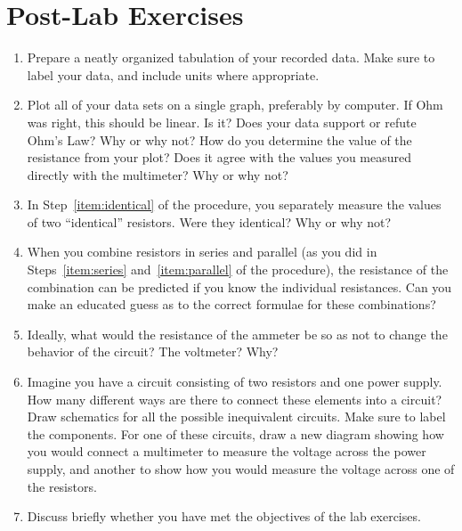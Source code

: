 \documentclass[12pt]{article}
\begin{document}
\newpage

\section*{Post-Lab Exercises}

\begin{enumerate}
\item Prepare a neatly organized tabulation of your recorded data.
  Make sure to label your data, and include units where appropriate.  
\item Plot all of your data sets on a single graph, preferably by
  computer.  If Ohm was right, this should be linear.  Is it?  Does
  your data support or refute Ohm's Law?  Why or why not?  How do you
  determine the value of the resistance from your plot?  Does it agree
  with the values you measured directly with the multimeter?  Why or
  why not?
\item In Step~\ref{item:identical} of the procedure, you separately
  measure the values of two ``identical'' resistors.  Were they
  identical?  Why or why not?
\item When you combine resistors in series and parallel (as you did in
  Steps~\ref{item:series} and~\ref{item:parallel} of the procedure),
  the resistance of the combination can be predicted if you know the
  individual resistances.  Can you make an educated guess as to the
  correct formulae for these combinations?
\item Ideally, what would the resistance of the ammeter be so as not
  to change the behavior of the circuit?  The voltmeter?  Why?
\item Imagine you have a circuit consisting of two resistors and one
  power supply.  How many different ways are there to connect these
  elements into a circuit?  Draw schematics for all the possible
  inequivalent circuits.  Make sure to label the components.  For one
  of these circuits, draw a new diagram showing how you would connect
  a multimeter to measure the voltage across the power supply, and
  another to show how you would measure the voltage across one of the
  resistors.
\item Discuss briefly whether you have met the objectives of the lab
  exercises.  
\end{enumerate}
\end{document}
